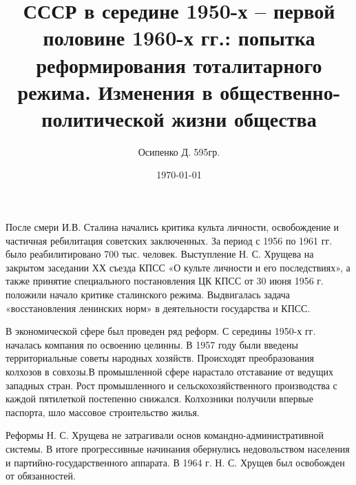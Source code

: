 \documentclass[a4paper, 12pt]{article}
\title{СССР в середине 1950-х – первой половине 1960-х гг.: попытка реформирования тоталитарного режима. Изменения в общественно-политической жизни общества}
\author{Осипенко Д. 595гр.}
\date{\today}
\begin{document}
\sffamily
\maketitle
После смери И.В. Сталина начались критика культа личности, освобождение и частичная ребилитация советских заключенных. За период с 1956 по 1961 гг. было реабилитировано 700 тыс. человек. Выступление Н. С. Хрущева на закрытом заседании ХХ съезда КПСС «О культе личности и его последствиях», а также принятие специального постановления ЦК КПСС от 30 июня 1956 г. положили начало критике сталинского режима. Выдвигалась задача «восстановления ленинских норм» в деятельности государства и КПСС.

В экономической сфере был проведен ряд реформ. С середины 1950-х гг. началась компания по освоению целинны. В 1957 году были введены территориальные советы народных хозяйств. Происходят преобразования колхозов в совхозы.В промышленной сфере нарастало отставание от ведущих западных стран. Рост промышленного и сельскохозяйственного производства с каждой пятилеткой постепенно снижался. Колхозники получили впервые паспорта, шло массовое строительство жилья.

Реформы Н. С. Хрущева не затрагивали основ командно-административной системы. В итоге прогрессивные начинания обернулись недовольством населения и партийно-государственного аппарата. В 1964 г. Н. С. Хрущев был освобожден от обязанностей.
\end{document}
